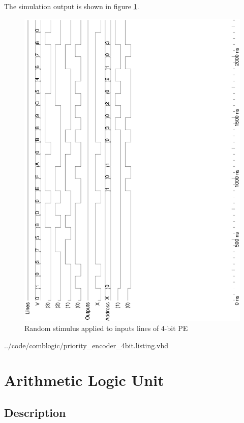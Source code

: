 \documentclass[10pt,a4paper]{report}
\begin{document}
 The simulation output is shown in figure \ref{wave:pe4}.
 
 \begin{figure}[h!]
 \center
 \includegraphics[scale=0.3495,angle=-90]{graphs/priority_encoder_4bit.ps}
 \caption{\small{Random stimulus applied to inputs lines of 4-bit PE}} \label{wave:pe4}
 \end{figure}


{../code/comblogic/priority_encoder_4bit.listing.vhd}

\pagebreak
\section{Arithmetic Logic Unit}
\subsection{Description}
\end{document}

